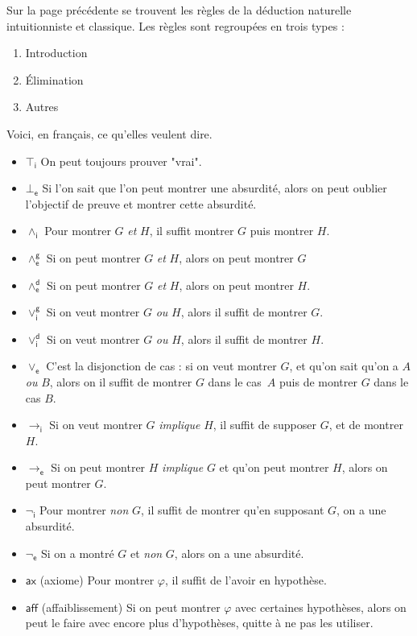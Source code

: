\documentclass{../notes}
\begin{document}
  Sur la page précédente se trouvent les règles de la déduction naturelle intuitionniste et classique.
  Les règles sont regroupées en trois types :
  \begin{multicols}{3}
    \begin{enumerate}
      \item Introduction 
      \item Élimination
      \item Autres
    \end{enumerate}
  \end{multicols}

  Voici, en français, ce qu'elles veulent dire.
  \begin{itemize}
    \item $\top_\mathsf{i}$ On peut toujours prouver "vrai".
    \item $\bot_\mathsf{e}$ Si l'on sait que l'on peut montrer une absurdité, alors on peut oublier l'objectif de preuve et montrer cette absurdité.
    \item $\land_\mathsf{i}$ Pour montrer $G$ \textit{et} $H$, il suffit montrer $G$ puis montrer $H$.
    \item  $\land_\mathsf{e}^\mathsf{g}$ Si on peut montrer $G$ \textit{et} $H$, alors on peut montrer $G$ 
    \item  $\land_\mathsf{e}^\mathsf{d}$ Si on peut montrer $G$ \textit{et} $H$, alors on peut montrer $H$.
    \item $\lor_\mathsf{i}^\mathsf{g}$ Si on veut montrer $G$ \textit{ou} $H$, alors il suffit de montrer $G$.
    \item $\lor_\mathsf{i}^\mathsf{d}$ Si on veut montrer $G$ \textit{ou} $H$, alors il suffit de montrer $H$.
    \item $\lor_\mathsf{e}$ C'est la disjonction de cas : si on veut montrer $G$, et qu'on sait qu'on a $A$ \textit{ou} $B$, alors on il suffit de montrer $G$ dans le cas~$A$ puis de montrer $G$ dans le cas $B$.
    \item $\to_\mathsf{i}$ Si on veut montrer $G$ \textit{implique} $H$, il suffit de supposer $G$, et de montrer $H$.
    \item $\to_\mathsf{e}$ Si on peut montrer $H$ \textit{implique} $G$ et qu'on peut montrer $H$, alors on peut montrer $G$.
    \item $\lnot_\mathsf{i}$ Pour montrer \textit{non} $G$, il suffit de montrer qu'en supposant $G$, on a une absurdité.
    \item $\lnot_\mathsf{e}$ Si on a montré $G$ et  \textit{non} $G$, alors on a une absurdité.
    \item $\mathsf{ax}$ (axiome) Pour montrer $\varphi$, il suffit de l'avoir en hypothèse.
    \item $\mathsf{aff}$ (affaiblissement) Si on peut montrer $\varphi$ avec certaines hypothèses, alors on peut le faire avec encore plus d'hypothèses, quitte à ne pas les utiliser.
  \end{itemize}
\end{document}
